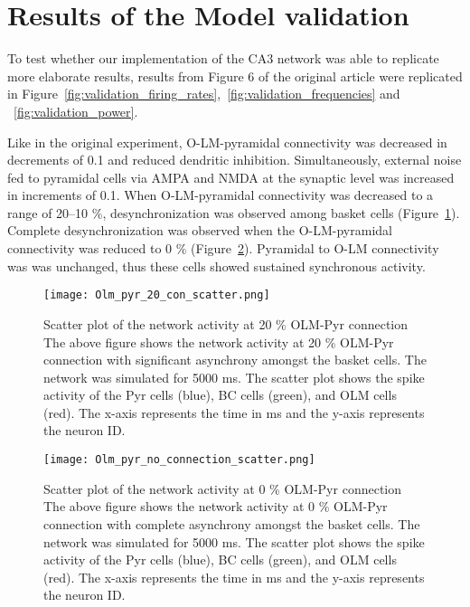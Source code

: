 \section{Results of the Model validation}
To test whether our implementation of the CA3 network was able to replicate
more elaborate results, results from Figure 6 of the original
\textcite{sanjayImpairedDendriticInhibition2015} article were replicated in
Figure~\ref{fig:validation_firing_rates},~\ref{fig:validation_frequencies} and
~\ref{fig:validation_power}.

Like in the original experiment, O-LM-pyramidal connectivity was decreased in decrements of 0.1 and reduced dendritic inhibition.
Simultaneously, external noise fed to pyramidal cells via AMPA and NMDA at the synaptic level was increased in increments of 0.1.
When O-LM-pyramidal connectivity was decreased to a range of 20--10 \%, desynchronization was observed among basket cells (Figure~\ref{fig:scatterplot_20_con_olm_pyr}).
Complete desynchronization was observed when the O-LM-pyramidal connectivity was reduced to 0 \% (Figure~\ref{fig:scatterplot_0_con_olm_pyr}).
Pyramidal to O-LM connectivity was was unchanged, thus these cells showed sustained synchronous activity.

\begin{figure}[htbp]
    \centering
    \texttt{[image: Olm\_pyr\_20\_con\_scatter.png]}
    \caption[20 \% OLM-Pyr connection scatter plot]{Scatter plot of the network activity at 20 \% OLM-Pyr connection
        The above figure shows the network activity at 20 \% OLM-Pyr connection with significant asynchrony amongst the basket cells.
        The network was simulated for 5000 ms.
        The scatter plot shows the spike activity of the Pyr cells (blue), BC cells (green), and OLM cells (red).
        The x-axis represents the time in ms and the y-axis represents the neuron ID\@.}\label{fig:scatterplot_20_con_olm_pyr}
\end{figure}

\begin{figure}[htbp]
    \centering
    \texttt{[image: Olm\_pyr\_no\_connection\_scatter.png]}
    \caption[0 \% OLM-Pyr connection scatter plot]{Scatter plot of the network activity at 0 \% OLM-Pyr connection
        The above figure shows the network activity at 0 \% OLM-Pyr connection with complete asynchrony amongst the basket cells.
        The network was simulated for 5000 ms.
        The scatter plot shows the spike activity of the Pyr cells (blue), BC cells (green), and OLM cells (red).
        The x-axis represents the time in ms and the y-axis represents the neuron ID\@.}\label{fig:scatterplot_0_con_olm_pyr}
\end{figure}

